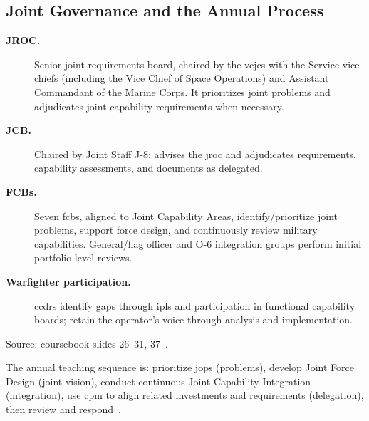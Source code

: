 \documentclass[../main.tex]{subfiles}
\begin{document}
\subsection{Joint Governance and the Annual Process}
\begin{description}
  \item[\textbf{JROC.}] Senior joint requirements board, chaired by the \ac{vcjcs} with the Service vice chiefs (including the Vice Chief of Space Operations) and Assistant Commandant of the Marine Corps. It prioritizes joint problems and adjudicates joint capability requirements when necessary.
  \item[\textbf{JCB.}] Chaired by Joint Staff J-8; advises the \ac{jroc} and adjudicates requirements, capability assessments, and documents as delegated.
  \item[\textbf{FCBs.}] Seven \acp{fcb}, aligned to Joint Capability Areas, identify/prioritize joint problems, support force design, and continuously review military capabilities. General/flag officer and O-6 integration groups perform initial portfolio-level reviews.
  \item[\textbf{Warfighter participation.}] \acp{ccdr} identify gaps through \acp{ipl} and participation in functional capability boards; retain the operator's voice through analysis and implementation.
\end{description}
\noindent Source: coursebook slides 26--31, 37~\autocite{edo-3-3-3-jfrp-2026}.

The annual teaching sequence is: prioritize \acp{jop} (problems), develop Joint Force Design (joint vision), conduct continuous Joint Capability Integration (integration), use \ac{cpm} to align related investments and requirements (delegation), then review and respond~\autocite[slide 31]{edo-3-3-3-jfrp-2026}.
\end{document}
